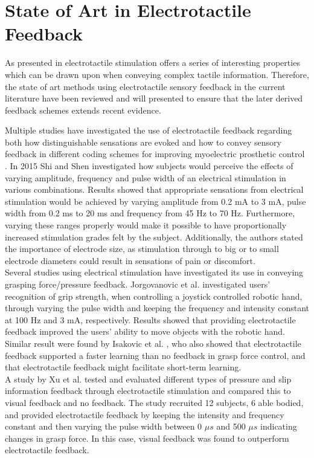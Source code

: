 \section{State of Art in Electrotactile Feedback}

As presented in  electrotactile stimulation offers a series of interesting properties which can be drawn upon when conveying complex tactile information. Therefore, the state of art methods using electrotactile sensory feedback in the current literature have been reviewed and will presented to ensure that the later derived feedback schemes extends recent evidence. 

Multiple studies have investigated the use of electrotactile feedback regarding both how distinguishable sensations are evoked and how to convey sensory feedback in different coding schemes for improving myoelectric prosthetic control \cite{Stephens-Fripp2018}. 
In 2015 Shi and Shen \cite{Shi2015} investigated how subjects would perceive the effects of varying amplitude, frequency and pulse width of an electrical stimulation in various combinations. Results showed that appropriate sensations from electrical stimulation would be achieved by varying amplitude from 0.2 mA to 3 mA, pulse width from 0.2 ms to 20 ms and frequency from 45 Hz to 70 Hz. Furthermore, varying these ranges properly would make it possible to have proportionally increased stimulation grades felt by the subject. Additionally, the authors stated the importance of electrode size, as stimulation through to big or to small electrode diameters could result in sensations of pain or discomfort. \cite{Shi2015} \\         
Several studies \cite{Pamungkas2015,Xu2016,Jorgovanovic2014,Isakovic2016} using electrical stimulation have investigated its use in conveying grasping force/pressure feedback. Jorgovanovic et al.\cite{Jorgovanovic2014} investigated users' recognition of grip strength, when controlling a joystick controlled robotic hand, through varying the pulse width and keeping the frequency and intensity constant at 100 Hz and 3 mA, respectively. Results showed that providing electrotactile feedback improved the users' ability to move objects with the robotic hand. \cite{Jorgovanovic2014} Similar result were found by Isakovic et al. \cite{Isakovic2016}, who also showed that electrotactile feedback supported a faster learning than no feedback in grasp force control, and that electrotactile feedback might facilitate short-term learning. \\ 
A study by Xu et al. \cite{Xu2016} tested and evaluated different types of pressure and slip information feedback through electrotactile stimulation and compared this to visual feedback and no feedback. The study recruited 12 subjects, 6 able bodied, and provided electrotactile feedback by keeping the intensity and frequency constant and then varying the pulse width between 0 $\mu s$ and 500 $\mu s$ indicating changes in grasp force. In this case, visual feedback was found to outperform electrotactile feedback. \cite{Xu2016} \\
